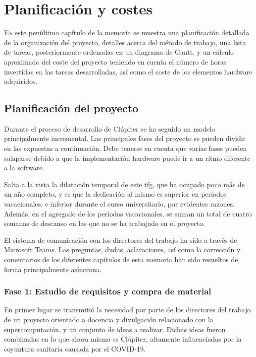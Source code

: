 \chapter{Planificación y costes}
\label{chap:planificacion_costes}

\lettrine{E}{n} este penúltimo capítulo de la memoria se muestra una planificación detallada de la organización del proyecto, detalles acerca del método de trabajo, una lista de tareas, posteriormente ordenadas en un diagrama de Gantt, y un cálculo aproximado del coste del proyecto teniendo en cuenta el número de horas invertidas en las tareas desarrolladas, así como el coste de los elementos hardware adquiridos.

\section{Planificación del proyecto}
Durante el proceso de desarrollo de Clúpiter se ha seguido un modelo principalmente incremental. Las principales fases del proyecto se pueden dividir en las expuestas a continuación. Debe tenerse en cuenta que varias fases pueden solaparse debido a que la implementación hardware puede ir a un ritmo diferente a la software.

Salta a la vista la dilatación temporal de este \acrshort{tfg}, que ha ocupado poco más de un año completo, y es que la dedicación al mismo es superior en períodos vacacionales, e inferior durante el curso universitario, por evidentes razones. Además, en el agregado de los períodos vacacionales, se suman un total de cuatro semanas de descanso en las que no se ha trabajado en el proyecto. 

El sistema de comunicación con los directores del trabajo ha sido a través de Microsoft Teams. Las preguntas, dudas, aclaraciones, así como la corrección y comentarios de los diferentes capítulos de esta memoria han sido resueltos de forma principalmente asíncrona.

\subsection{Fase 1: Estudio de requisitos y compra de material}
En primer lugar se transmitió la necesidad por parte de los directores del trabajo de un proyecto orientado a docencia y divulgación relacionado con la supercomputación, y un conjunto de ideas a realizar. Dichas ideas fueron combinadas en lo que ahora mismo es Clúpiter, altamente influenciadas por la coyuntura sanitaria causada por el COVID-19.

